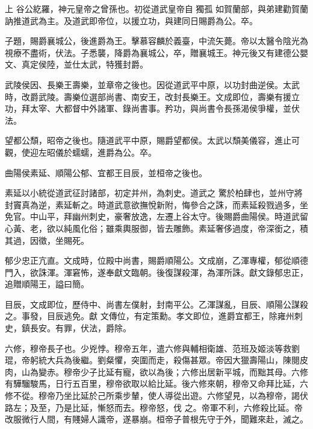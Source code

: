 
\begin{pinyinscope}

 上
 谷公紇羅，神元皇帝之曾孫也。初從道武皇帝自
 獨孤
 如賀蘭部，與弟建勸賀蘭訥推道武為主。及道武即帝位，以援立功，與建同日賜爵為公。卒。



 子題，賜爵襄城公，後進爵為王。擊慕容麟於義臺，中流矢薨。帝以太醫令陰光為視療不盡術，伏法。子悉襲，降爵為襄城公，卒，贈襄城王。神元後又有建德公嬰文、真定侯陸，並仕太武，特獲封爵。



 武陵侯因、長樂王壽樂，並章帝之後也。因從道武平中原，以功封曲逆侯。太武時，改爵武陵。壽樂位選部尚書、南安王，改封長樂王。文成即位，壽樂有援立功，拜太宰、大都督中外諸軍、錄尚書事。矜功，與尚書令長孫渴侯爭權，並伏法。



 望都公頹，昭帝之後也。隨道武平中原，賜爵望都侯。太武以頹美儀容，進止可觀，使迎左昭儀於蠕蠕，進爵為公。卒。



 曲陽侯素延、順陽公郁、宜都王目辰，並桓帝之後也。



 素延以小統從道武征討諸部，初定并州，為刺史。道武之
 驚於柏肆也，並州守將封竇真為逆，素延斬之。時道武意欲撫悅新附，悔參合之誅，而素延殺戮過多，坐免官。中山平，拜幽州刺史，豪奢放逸，左遷上谷太守。後賜爵曲陽侯。時道武留心黃、老，欲以純風化俗；雖乘輿服御，皆去雕飾。素延奢侈過度，帝深銜之，積其過，因徵，坐賜死。



 郁少忠正亢直。文成時，位殿中尚書，賜爵順陽公。文成崩，乙渾專權，郁從順德門入，欲誅渾。渾窘怖，遂奉獻文臨朝。後復謀殺渾，為渾所誅。獻文錄郁忠正，追贈順陽王，謚曰簡。



 目辰，文成即位，歷侍中、尚書左僕射，封南平公。乙渾謀亂，目辰、順陽公謀殺之。事發，目辰逃免。獻
 文傳位，有定策勳。孝文即位，進爵宜都王，除雍州刺史，鎮長安。有罪，伏法，爵除。



 六修，穆帝長子也。少兇悖。穆帝五年，遣六修與輔相衛雄、范班及姬淡等救劉琨，帝躬統大兵為後繼。劉粲懼，突圍而走，殺傷甚眾。帝因大獵壽陽山，陳閱皮肉，山為變赤。穆帝少子比延有寵，欲以為後；六修出居新平城，而黜其母。六修有驊騮駿馬，日行五百里，穆帝欲取以給比延。後六修來朝，穆帝又命拜比延，六修不從。穆帝乃坐比延於己所乘步輦，使人導從出遊。六修望見，以為穆帝，謁伏路左；及至，乃是比延，慚怒而去。穆帝怒，伐
 之。帝軍不利，六修殺比延。帝改服微行人間，有賤婦人識帝，遂暴崩。桓帝子普根先守于外，聞難來赴，滅之。




\end{pinyinscope}
